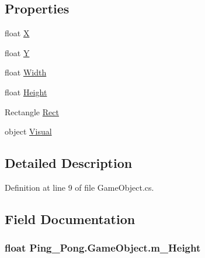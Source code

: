 \subsection*{Properties}
\begin{DoxyCompactItemize}
\item 
float \hyperlink{class_ping___pong_1_1_game_object_ada20bb1f95db380d4c1af7c2030b0c1b}{X}
\item 
float \hyperlink{class_ping___pong_1_1_game_object_adf561c4e05f7c2f4032d8302e01a3967}{Y}
\item 
float \hyperlink{class_ping___pong_1_1_game_object_a828f5327d84be8a61d48534b2dc39e92}{Width}
\item 
float \hyperlink{class_ping___pong_1_1_game_object_a66385f8db21929ffb9fa7f180db54f95}{Height}
\item 
Rectangle \hyperlink{class_ping___pong_1_1_game_object_a2f69360b5ba37b1ebb3cc324244060c2}{Rect}
\item 
object \hyperlink{class_ping___pong_1_1_game_object_ab7e73702e83fa5d455e191551fe86b22}{Visual}
\end{DoxyCompactItemize}


\subsection{Detailed Description}


Definition at line 9 of file Game\-Object.\-cs.



\subsection{Field Documentation}
\hypertarget{class_ping___pong_1_1_game_object_a22de23272c1b02fb7bf7b13da7804afb}{
\subsubsection[{m\-\_\-\-Height}]{\setlength{\rightskip}{0pt plus 5cm}float Ping\-\_\-\-Pong.\-Game\-Object.\-m\-\_\-\-Height\hspace{0.3cm}{\ttfamily [protected]}}}\label{class_ping___pong_1_1_game_object_a22de23272c1b02fb7bf7b13da7804afb}


